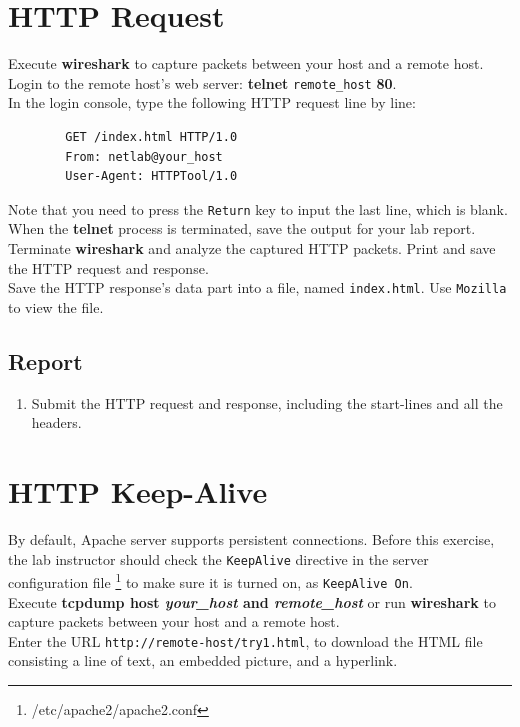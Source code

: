 \documentclass{../UTNetLab}
\begin{document}
\section{HTTP Request}
    Execute \textbf{wireshark} to capture packets between your host and a remote host. \\
    Login to the remote host’s web server: \textbf{telnet} \texttt{remote\_host} \textbf{80}. \\
    In the login console, type the following HTTP request line by line:
    \begin{verbatim}
        GET /index.html HTTP/1.0
        From: netlab@your_host
        User-Agent: HTTPTool/1.0
    \end{verbatim}
    Note that you need to press the \texttt{Return} key to input the last line, which is blank.
    When the \textbf{telnet} process is terminated, save the output for your lab report. \\
    Terminate \textbf{wireshark} and analyze the captured HTTP packets.
    Print and save the HTTP request and response. \\
    Save the HTTP response’s data part into a file, named \texttt{index.html}.
    Use \texttt{Mozilla} to view the file.
    \subsection*{Report}
    \begin{enumerate}
        \item Submit the HTTP request and response, including the start-lines and all the headers.
    \end{enumerate}

    
\section{HTTP Keep-Alive}
    By default, Apache server supports persistent connections. Before this exercise, the lab instructor should check the \texttt{KeepAlive} directive in the server configuration file \footnote{/etc/apache2/apache2.conf} to make sure it is turned on, as \texttt{KeepAlive On}. \\
    Execute \textbf{tcpdump host \textit{your\_host} and \textit{remote\_host}} or run \textbf{wireshark} to capture packets between your host and a remote host. \\
    
    Enter the URL \texttt{http://remote-host/try1.html}, to download the HTML file consisting a line of text, an embedded picture, and a hyperlink.\\
\end{document}
